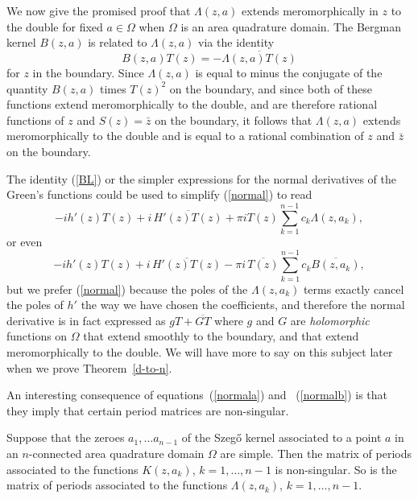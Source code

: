 \documentclass[12pt]{amsart}
\newcommand\Om{\Omega}
\numberwithin{equation}{section}
\begin{document}
We now give the promised proof that $\Lambda(z,a)$ extends
meromorphically in $z$ to the double for fixed $a\in\Om$ when
$\Om$ is an area quadrature domain. The Bergman kernel
$B(z,a)$ is related to $\Lambda(z,a)$ via the identity
\begin{equation}
\label{BL}
B(z,a)T(z)=-\overline{\Lambda(z,a)T(z)}
\end{equation}
for $z$ in the boundary.
Since $\Lambda(z,a)$ is
equal to minus the conjugate of the quantity $B(z,a)$ times
$T(z)^2$ on the boundary, and since both of these functions
extend meromorphically to the double, and are therefore
rational functions of $z$ and $S(z)=\bar z$ on the boundary,
it follows that $\Lambda(z,a)$ extends meromorphically to
the double and is equal to a rational combination of $z$
and $\bar z$ on the boundary.

The identity (\ref{BL}) or the simpler expressions for
the normal derivatives of the Green's functions could be
used to simplify (\ref{normal}) to read
\begin{equation}
\label{normala}
-ih'(z)T(z)+i\,\overline{H'(z)T(z)}+
\pi i  T(z) \sum_{k=1}^{n-1}c_k \Lambda(z,a_k),
\end{equation}
or even
\begin{equation}
\label{normalb}
-ih'(z)T(z)+i\,\overline{H'(z)T(z)}
-\pi i\,\overline{T(z)} \sum_{k=1}^{n-1}c_k
\overline{B(z,a_k)},
\end{equation}
but we prefer (\ref{normal}) because the poles
of the $\Lambda(z,a_k)$ terms exactly cancel
the poles of $h'$ the way we have chosen the
coefficients, and therefore the normal derivative
is in fact expressed as $gT+\overline{GT}$ where
$g$ and $G$ are {\it holomorphic\/} functions on
$\Om$ that extend smoothly to the boundary, and
that extend meromorphically to the double. We will
have more to say on this subject later when we
prove Theorem~\ref{d-to-n}.

An interesting consequence of equations~(\ref{normala})
and ~(\ref{normalb}) is that they imply that certain
period matrices are non-singular.

\begin{thm}
\label{periodmatrix}
Suppose that the zeroes $a_1,\dots a_{n-1}$ of the
Szeg\H o kernel associated to a point $a$ in an $n$-connected
area quadrature domain $\Om$ are simple. Then the matrix of
periods associated to the functions $K(z,a_k)$, $k=1,\dots,n-1$
is non-singular. So is the matrix of periods associated to the
functions $\Lambda(z,a_k)$, $k=1,\dots,n-1$.
\end{thm}
\end{document}
